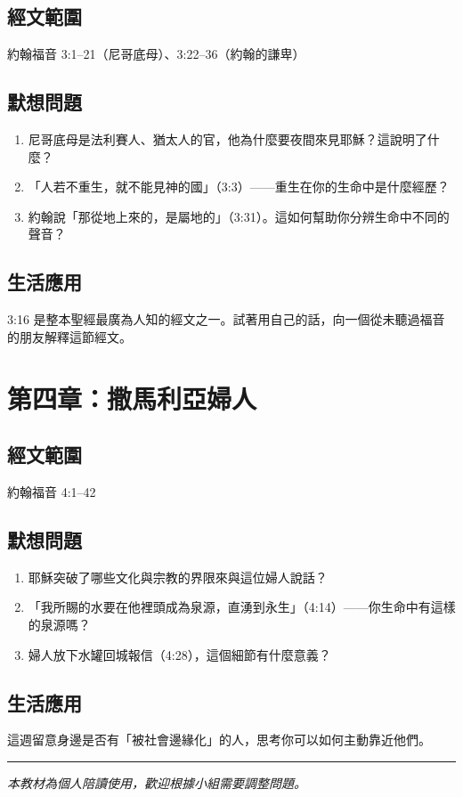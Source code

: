 \documentclass[12pt, a4paper]{article}
\begin{document}
\subsection*{經文範圍}
約翰福音 3:1--21（尼哥底母）、3:22--36（約翰的謙卑）

\subsection*{默想問題}
\begin{enumerate}[leftmargin=*, label=\arabic*.]
  \item 尼哥底母是法利賽人、猶太人的官，他為什麼要夜間來見耶穌？這說明了什麼？
  \item 「人若不重生，就不能見神的國」（3:3）——重生在你的生命中是什麼經歷？
  \item 約翰說「那從地上來的，是屬地的」（3:31）。這如何幫助你分辨生命中不同的聲音？
\end{enumerate}

\subsection*{生活應用}
3:16 是整本聖經最廣為人知的經文之一。試著用自己的話，向一個從未聽過福音的朋友解釋這節經文。

\section{第四章：撒馬利亞婦人}

\subsection*{經文範圍}
約翰福音 4:1--42

\subsection*{默想問題}
\begin{enumerate}[leftmargin=*, label=\arabic*.]
  \item 耶穌突破了哪些文化與宗教的界限來與這位婦人說話？
  \item 「我所賜的水要在他裡頭成為泉源，直湧到永生」（4:14）——你生命中有這樣的泉源嗎？
  \item 婦人放下水罐回城報信（4:28），這個細節有什麼意義？
\end{enumerate}

\subsection*{生活應用}
這週留意身邊是否有「被社會邊緣化」的人，思考你可以如何主動靠近他們。

\bigskip
\hrule
\bigskip
\noindent\textit{本教材為個人陪讀使用，歡迎根據小組需要調整問題。}
\end{document}
